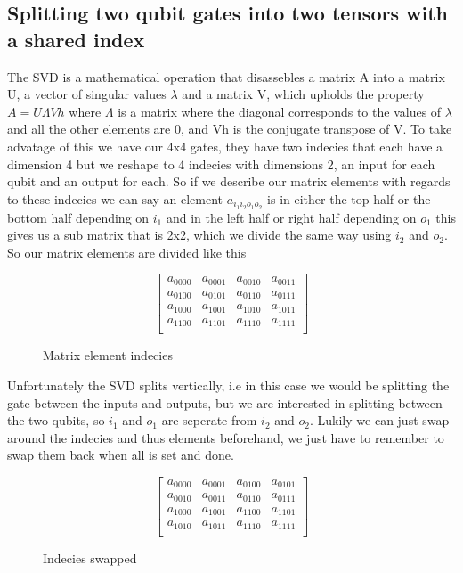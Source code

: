 \subsection{Splitting two qubit gates into two tensors with a shared index }
The SVD is a mathematical operation that disassebles a matrix A into a matrix U, a vector of singular values $\lambda$ and a matrix V, which upholds the property $A=U\Lambda Vh$ where $\Lambda$ is a matrix where the diagonal corresponds to the values of $\lambda$ and all the other elements are 0, and Vh is the conjugate transpose of V. To take advatage of this we have our 4x4 gates, they have two indecies that each have a dimension 4 but we reshape to 4 indecies with dimensions 2, an input for each qubit and an output for each. So if we describe our matrix elements with regards to these indecies we can say an element $a_{i_1i_2o_1o_2}$ is in either the top half or the bottom half depending on $i_1$ and in the left half or right half depending on $o_1$ this gives us a sub matrix that is 2x2, which we divide the same way using $i_2$ and $o_2$. So our matrix elements are divided like this 
\begin{figure}[H]
    $$
    \begin{bmatrix}
        a_{0000} & a_{0001} & a_{0010} & a_{0011}\\
        a_{0100} & a_{0101} & a_{0110} & a_{0111}\\
        a_{1000} & a_{1001} & a_{1010} & a_{1011}\\
        a_{1100} & a_{1101} & a_{1110} & a_{1111}\\
    \end{bmatrix}
    $$
    \caption{Matrix element indecies}
    \label{fig:matrix_indecies}
\end{figure}
\noindent
Unfortunately the SVD splits vertically, i.e in this case we would be splitting the gate between the inputs and outputs, but we are interested in splitting between the two qubits, so $i_1$ and $o_1$ are seperate from $i_2$ and $o_2$. Lukily we can just swap around the indecies and thus elements beforehand, we just have to remember to swap them back when all is set and done. 
\begin{figure}[H]
    $$
    \begin{bmatrix}
        a_{0000} & a_{0001} & a_{0100} & a_{0101}\\
        a_{0010} & a_{0011} & a_{0110} & a_{0111}\\
        a_{1000} & a_{1001} & a_{1100} & a_{1101}\\
        a_{1010} & a_{1011} & a_{1110} & a_{1111}\\
    \end{bmatrix}
    $$
    \caption{Indecies swapped}
    \label{fig:matrix_swapped}
\end{figure}

